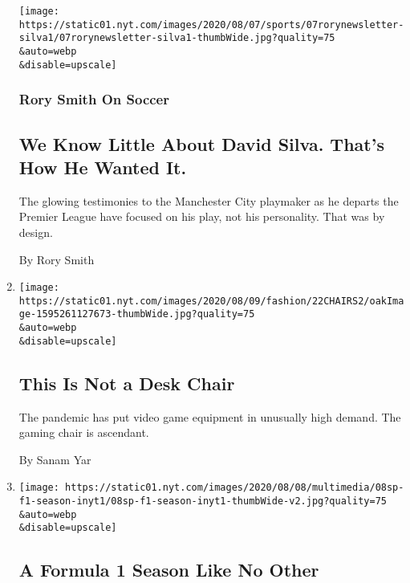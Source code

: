 \begin{enumerate}
  \texttt{[image: https://static01.nyt.com/images/2020/08/07/sports/07rorynewsletter-silva1/07rorynewsletter-silva1-thumbWide.jpg?quality=75\\\&auto=webp\\\&disable=upscale]}

  \hypertarget{rory-smith-on-soccer}{%
  \subsubsection{Rory Smith On Soccer}\label{rory-smith-on-soccer}}

  \hypertarget{we-know-little-about-david-silva-thats-how-he-wanted-it}{%
  \subsection{We Know Little About David Silva. That's How He Wanted
  It.}\label{we-know-little-about-david-silva-thats-how-he-wanted-it}}

  The glowing testimonies to the Manchester City playmaker as he departs
  the Premier League have focused on his play, not his personality. That
  was by design.

  By Rory Smith
\item
  \href{/2020/08/07/style/gamer-chair-market-herman-miller.html}{}

  \texttt{[image: https://static01.nyt.com/images/2020/08/09/fashion/22CHAIRS2/oakImage-1595261127673-thumbWide.jpg?quality=75\\\&auto=webp\\\&disable=upscale]}

  \hypertarget{this-is-not-a-desk-chair}{%
  \subsection{This Is Not a Desk Chair}\label{this-is-not-a-desk-chair}}

  The pandemic has put video game equipment in unusually high demand.
  The gaming chair is ascendant.

  By Sanam Yar
\item
  \href{/2020/08/07/sports/autoracing/formula-1-season-coronavirus.html}{}

  \texttt{[image: https://static01.nyt.com/images/2020/08/08/multimedia/08sp-f1-season-inyt1/08sp-f1-season-inyt1-thumbWide-v2.jpg?quality=75\\\&auto=webp\\\&disable=upscale]}

  \hypertarget{a-formula-1-season-like-no-other}{%
  \subsection{A Formula 1 Season Like No
  Other}\label{a-formula-1-season-like-no-other}}


\end{enumerate}

